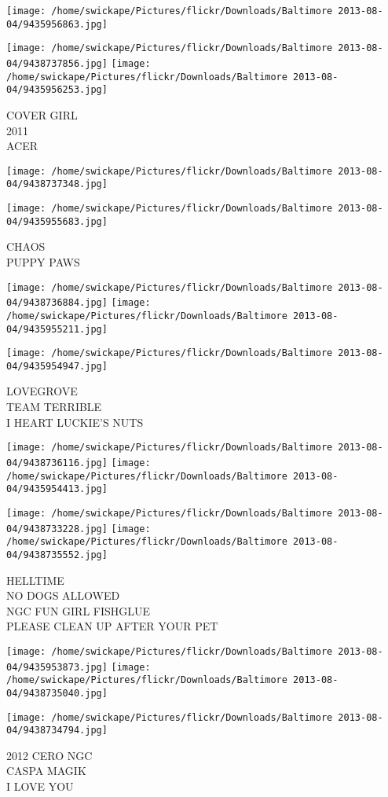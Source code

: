 \documentclass[10pt,letterpaper]{article}
\begin{document}
\texttt{[image: /home/swickape/Pictures/flickr/Downloads/Baltimore 2013-08-04/9435956863.jpg]}

\vspace{0.25in}
\texttt{[image: /home/swickape/Pictures/flickr/Downloads/Baltimore 2013-08-04/9438737856.jpg]}
\texttt{[image: /home/swickape/Pictures/flickr/Downloads/Baltimore 2013-08-04/9435956253.jpg]}

COVER GIRL\\
2011\\
ACER\\
\pagebreak

\texttt{[image: /home/swickape/Pictures/flickr/Downloads/Baltimore 2013-08-04/9438737348.jpg]}

\vspace{0.25in}
\texttt{[image: /home/swickape/Pictures/flickr/Downloads/Baltimore 2013-08-04/9435955683.jpg]}

CHAOS\\
PUPPY PAWS\\
\pagebreak

\texttt{[image: /home/swickape/Pictures/flickr/Downloads/Baltimore 2013-08-04/9438736884.jpg]}
\texttt{[image: /home/swickape/Pictures/flickr/Downloads/Baltimore 2013-08-04/9435955211.jpg]}

\vspace{0.25in}
\texttt{[image: /home/swickape/Pictures/flickr/Downloads/Baltimore 2013-08-04/9435954947.jpg]}

LOVEGROVE\\
TEAM TERRIBLE\\
I HEART LUCKIE'S NUTS\\
\pagebreak

\texttt{[image: /home/swickape/Pictures/flickr/Downloads/Baltimore 2013-08-04/9438736116.jpg]}
\texttt{[image: /home/swickape/Pictures/flickr/Downloads/Baltimore 2013-08-04/9435954413.jpg]}

\texttt{[image: /home/swickape/Pictures/flickr/Downloads/Baltimore 2013-08-04/9438733228.jpg]}
\texttt{[image: /home/swickape/Pictures/flickr/Downloads/Baltimore 2013-08-04/9438735552.jpg]}

HELLTIME\\
NO DOGS ALLOWED\\
NGC FUN GIRL FISHGLUE\\
PLEASE CLEAN UP AFTER YOUR PET\\
\pagebreak

\texttt{[image: /home/swickape/Pictures/flickr/Downloads/Baltimore 2013-08-04/9435953873.jpg]}
\texttt{[image: /home/swickape/Pictures/flickr/Downloads/Baltimore 2013-08-04/9438735040.jpg]}

\vspace{0.25in}
\texttt{[image: /home/swickape/Pictures/flickr/Downloads/Baltimore 2013-08-04/9438734794.jpg]}

2012 CERO NGC\\
CASPA MAGIK\\
I LOVE YOU\\
\pagebreak
\end{document}
